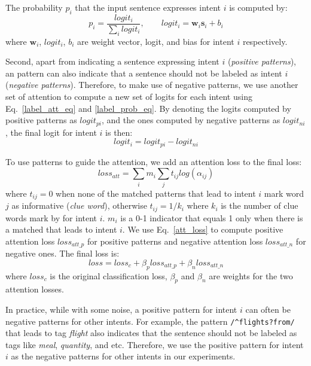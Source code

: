 The probability $p_i$ that the input sentence expresses intent $i$ is computed by:
\begin{equation}
p_i = \frac{logit_i}{\sum_{i}{logit_i}}, \quad\quad logit_i=\textbf{w}_i\textbf{s}_i + b_i 
\label{label_prob_eq}
\end{equation}
where $\textbf{w}_i$, $logit_i$, $b_i$ are weight vector, logit, and bias for intent $i$ respectively.

Second, apart from indicating a sentence expressing intent $i$ (\emph{positive patterns}), an \RE pattern can also indicate that a sentence should not be labeled as intent $i$ (\emph{negative patterns}). Therefore, to make use of negative patterns, we use another set of attention to compute a new set of logits for each intent using Eq.~\ref{label_att_eq} and \ref{label_prob_eq}. By denoting the logits computed by positive patterns as $logit_{pi}$, and the ones computed by negative patterns as $logit_{ni}$, the final logit for intent $i$ is then: 
\begin{equation}
logit_i = logit_{pi} - logit_{ni}
\end{equation}

To use \RE patterns to guide the attention, we add an attention loss to the final loss:
\begin{equation}
loss_{att} = \sum_{i}{m_i\sum_{j}{t_{ij}log(\alpha_{ij})}}
\label{att_loss}
\end{equation}
where $t_{ij} = 0$ when none of the matched patterns that lead to intent $i$ mark word $j$ as informative (\emph{clue word}), otherwise $t_{ij} = 1/k_{i}$ where $k_i$ is the number of clue words mark by \RE for intent $i$. $m_i$ is a 0-1 indicator that equals 1 only when there is a matched \RE that leads to intent $i$. We use Eq.~\ref{att_loss} to compute positive attention loss $loss_{att\_p}$ for positive patterns and negative attention loss $loss_{att\_n}$ for negative ones. The final loss is:
\begin{equation}
loss = loss_{c} + \beta_p loss_{att\_p} + \beta_n loss_{att\_n}
\end{equation} 
where $loss_{c}$ is the original classification loss, $\beta_p$ and $\beta_n$ are weights for the two attention losses.

In practice, while with some noise, a positive pattern for intent $i$ can often be negative patterns for other intents. For example, the pattern \texttt{/\textasciicircum flights?\:from/} that leads to tag \emph{flight} also indicates that the sentence should not be labeled as tags like \emph{meal}, \emph{quantity}, and etc.
Therefore, we use the positive pattern for intent $i$ as the negative patterns for other intents in our experiments.

